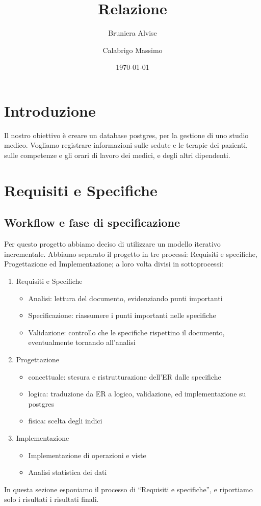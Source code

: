 \documentclass[11pt]{article}
\title{Relazione}
\author{Bruniera Alvise\and Calabrigo Massimo}
\affil{Università degli studi di Udine}
\date{\today}
\begin{document}
\maketitle

\tableofcontents
\section{Introduzione}
Il nostro obiettivo è creare un database postgres, per la gestione di uno studio medico.
Vogliamo registrare informazioni sulle sedute e le terapie dei pazienti, sulle competenze e gli orari di lavoro dei medici, e degli altri dipendenti.
\section{Requisiti e Specifiche}

\subsection{Workflow e fase di specificazione}
Per questo progetto abbiamo deciso di utilizzare un modello iterativo incrementale.
Abbiamo separato il progetto in tre processi: Requisiti e specifiche, Progettazione ed Implementazione;
a loro volta divisi in sottoprocessi:
\begin{enumerate}
    \item Requisiti e Specifiche
    \begin{itemize}
        \item Analisi: lettura del documento, evidenziando punti importanti
        \item Specificazione: riassumere i punti importanti nelle specifiche
        \item Validazione: controllo che le specifiche rispettino il documento, eventualmente tornando all'analisi
    \end{itemize}
    \item Progettazione
    \begin{itemize}
        \item concettuale: stesura e ristrutturazione dell'ER dalle specifiche
        \item logica: traduzione da ER a logico, validazione, ed implementazione su postgres
        \item fisica: scelta degli indici
    \end{itemize}
    \item Implementazione
    \begin{itemize}
        \item Implementazione di operazioni e viste
        \item Analisi statistica dei dati
    \end{itemize}
\end{enumerate}
In questa sezione esponiamo il processo di ``Requisiti e specifiche'', e riportiamo
solo i risultati i risultati finali.
\end{document}
